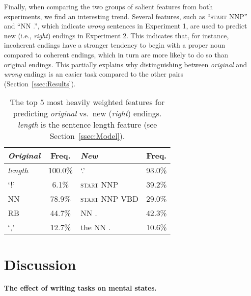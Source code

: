 \documentclass[11pt,a4paper]{article}
\newcommand{\secref}[1]{Section~\ref{ssec:#1}}
\newcommand{\isectionb}[1]{\section{#1}\label{ssec:#1}}
\newcommand{\shortv}[1]{}
\begin{document}
{Finally, when comparing the two groups of salient features from both experiments, we find an interesting trend.
Several features, such as ``\textsc{start} NNP'' and  ``NN .'', which indicate {\it wrong} sentences in Experiment 1, are used to predict new (i.e., {\it right}) endings in Experiment 2. 
This indicates that, for instance, incoherent endings have a stronger tendency to begin with a proper noun compared to coherent endings, 
which in turn are more likely to do so than original endings. 
This partially explains why distinguishing between {\it original} and {\it wrong} endings is an easier task compared to the other pairs (\secref{Results}).


\setlength\tabcolsep{.15cm}
\begin{table}[!t]
\begin{center}
\begin{tabular}{|p{1.25cm}|c||p{2.9cm}|c|} \hline
\textit{\textbf{Original}} & Freq. & \textit{\textbf{New}}& Freq. \\ \hline
{\it length} & {\color{white}{.}}100.0\% & `.' & 93.0\%\\ \hline
`!' & {\color{white}{00}}6.1\%& \textsc{start} NNP  & 39.2\% \\ \hline
NN & {\color{white}{00}}78.9\% & \textsc{start} NNP VBD &29.0\% \\ \hline
RB & {\color{white}{0}}44.7\%& NN . & 42.3\% \\ \hline
`,' & {\color{white}{0}}12.7\%&  the NN . & 10.6\% \\ \hline

\end{tabular}
\end{center}
\caption{\label{exp2_features}
The top 5 most heavily weighted features for predicting {\it original} vs.~new ({\it right}) endings.
{\it length} is the sentence length feature (see \secref{Model}).
}
\end{table}
}

\isectionb{Discussion}

\paragraph{The effect of writing tasks on mental states.}
\shortv{In this paper we have shown that giving a writer different writing tasks affects her writing style in easily detected ways.
Our results indicate that when authors are asked to write the last
sentence of a short story, they will use different style to
write a {\it right} ending compared to a {\it wrong} ending. We have
also shown that writing the ending as part of one's own story is very different than reading a story prefix and then writing the ending.
\shortv{Our findings hint that the nature of the writing task imposes a
different mental state on the author, which is expressed in ways that can be observed using extremely simple automatic tools. }}
\end{document}
